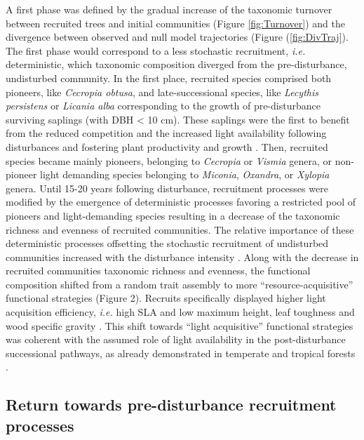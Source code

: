 \documentclass[fleqn,10pt]{ArtEcoFoG} %
\begin{document}
A first phase was defined by the gradual increase of the taxonomic turnover between recruited trees and initial communities (Figure \ref{fig:Turnover}) and the divergence between observed and null model trajectories (Figure (\ref{fig:DivTraj}).
The first phase would correspond to a less stochastic recruitment, \emph{i.e.} deterministic, which taxonomic composition diverged from the pre-disturbance, undisturbed community.
In the first place, recruited species comprised both pioneers, like \emph{Cecropia obtusa}, and late-successional species, like \emph{Lecythis persistens} or \emph{Licania alba} corresponding to the growth of pre-disturbance surviving saplings (with DBH \textless{} 10 cm).
These saplings were the first to benefit from the reduced competition and the increased light availability following disturbances and fostering plant productivity and growth \citep{Monteith1972, Chazdon1984}.
Then, recruited species became mainly pioneers, belonging to \emph{Cecropia} or \emph{Vismia} genera, or non-pioneer light demanding species belonging to \emph{Miconia}, \emph{Oxandra}, or \emph{Xylopia} genera.
Until 15-20 years following disturbance, recruitment processes were modified by the emergence of deterministic processes favoring a restricted pool of pioneers and light-demanding species resulting in a decrease of the taxonomic richness and evenness of recruited communities.
The relative importance of these deterministic processes offsetting the stochastic recruitment of undisturbed communities increased with the disturbance intensity \citep{Bongers2009}.
Along with the decrease in recruited communities taxonomic richness and evenness, the functional composition shifted from a random trait assembly to more ``resource-acquisitive'' functional strategies (Figure 2).
Recruits specifically displayed higher light acquisition efficiency, \emph{i.e.} high SLA and low maximum height, leaf toughness and wood specific gravity \citep{Wright2004, Chave2009b, Herault2011}.
This shift towards ``light acquisitive'' functional strategies was coherent with the assumed role of light availability in the post-disturbance successional pathways, as already demonstrated in temperate and tropical forests \citep{Pena2008, Carreno2012, Kunstler2016, Both2019}.

\hypertarget{return-towards-pre-disturbance-recruitment-processes}{%
\subsection{Return towards pre-disturbance recruitment processes}\label{return-towards-pre-disturbance-recruitment-processes}}
\end{document}
